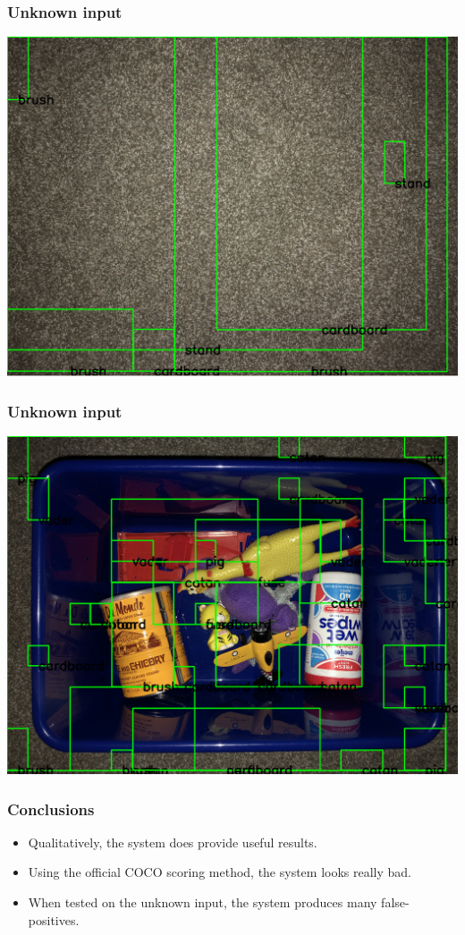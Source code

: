\documentclass{beamer}
\begin{document}
\begin{frame}
  \frametitle{Unknown input}
  \includegraphics[width=\textwidth]{unknown2.png}
\end{frame}

\begin{frame}
  \frametitle{Unknown input}
  \includegraphics[width=\textwidth]{unknown3.png}
\end{frame}

\begin{frame}
  \frametitle{Conclusions}
  \begin{itemize}
    \item Qualitatively, the system does provide useful results.
    \item Using the official COCO scoring method, the system looks really bad.
    \item When tested on the unknown input, the system produces many false-positives.
  \end{itemize}
\end{frame}
\end{document}
